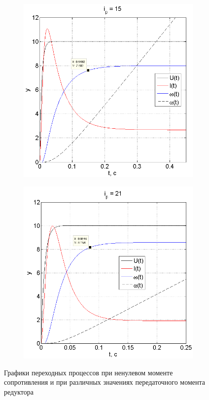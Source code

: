 \documentclass[fleqn, a4paper, 11pt, russian]{article}
\begin{document}
	\begin{figure}[ht!]\ContinuedFloat
		\centering
		\begin{subfigure}[b]{0.45\textwidth}
			\includegraphics[width = \textwidth]{M44i15}
		\end{subfigure}
		\hfill
		\begin{subfigure}[b]{0.45\textwidth}
			\includegraphics[width = \textwidth]{M44i21}
		\end{subfigure}
		\caption{Графики переходных процессов при ненулевом моменте сопротивления и при различных значениях передаточного момента редуктора}
		\label{M44ivar}
	\end{figure}
\end{document}
